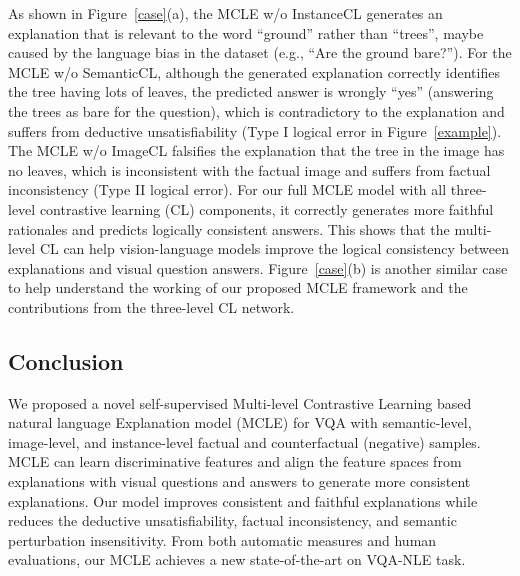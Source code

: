 \documentclass[letterpaper]{article} %
\begin{document}
As shown in Figure~\ref{case}(a), the MCLE w/o InstanceCL generates an explanation that is relevant to the word ``ground'' rather than ``trees'', maybe caused by the language bias in the dataset (e.g., ``Are the ground bare?''). For the MCLE w/o SemanticCL, although the generated explanation correctly identifies the tree having lots of leaves, the predicted answer is wrongly ``yes'' (answering the trees as bare for the question), which is contradictory to the explanation and suffers from deductive unsatisfiability (Type I logical error in Figure~\ref{example}). The MCLE w/o ImageCL falsifies the explanation that the tree in the image has no leaves, which is inconsistent with the factual image and suffers from factual inconsistency  (Type II logical error). For our full MCLE model with all three-level contrastive learning (CL) components, it correctly generates more faithful rationales and predicts logically consistent answers. This shows that the multi-level CL can help vision-language models improve the logical consistency between explanations and visual question answers. Figure~\ref{case}(b) is another similar case to help understand the working of our proposed MCLE framework and the contributions from the three-level CL network.



\subsection{Conclusion}
We proposed a novel self-supervised {M}ulti-level {C}ontrastive {L}earning based natural language {E}xplanation model (MCLE) for VQA with semantic-level, image-level, and instance-level factual and counterfactual (negative) samples. MCLE can learn discriminative features and align the feature spaces from explanations with visual questions and answers to generate more consistent explanations. Our model improves consistent and faithful explanations while reduces the deductive unsatisfiability, factual inconsistency, and semantic perturbation insensitivity. From both automatic measures and human evaluations, our MCLE achieves a new state-of-the-art on VQA-NLE task. 
\end{document}
